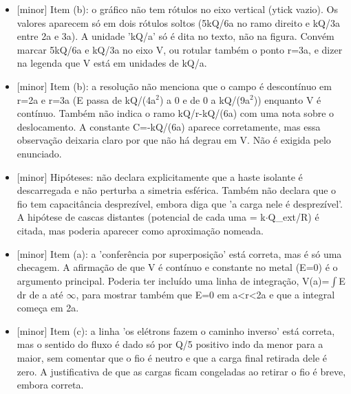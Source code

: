 \documentclass{article}%
\begin{document}
\begin{itemize}%
\item%
{[}minor{]} Item (b): o gráfico não tem rótulos no eixo vertical (ytick vazio). Os valores aparecem só em dois rótulos soltos (5kQ/6a no ramo direito e kQ/3a entre 2a e 3a). A unidade 'kQ/a' só é dita no texto, não na figura. Convém marcar 5kQ/6a e kQ/3a no eixo V, ou rotular também o ponto r=3a, e dizer na legenda que V está em unidades de kQ/a.%
\item%
{[}minor{]} Item (b): a resolução não menciona que o campo é descontínuo em r=2a e r=3a (E passa de kQ/(4a$^2$) a 0 e de 0 a kQ/(9a$^2$)) enquanto V é contínuo. Também não indica o ramo kQ/r-kQ/(6a) com uma nota sobre o deslocamento. A constante C=-kQ/(6a) aparece corretamente, mas essa observação deixaria claro por que não há degrau em V. Não é exigida pelo enunciado.%
\item%
{[}minor{]} Hipóteses: não declara explicitamente que a haste isolante é descarregada e não perturba a simetria esférica. Também não declara que o fio tem capacitância desprezível, embora diga que 'a carga nele é desprezível'. A hipótese de cascas distantes (potencial de cada uma = k$\cdot$Q\_ext/R) é citada, mas poderia aparecer como aproximação nomeada.%
\item%
{[}minor{]} Item (a): a 'conferência por superposição' está correta, mas é só uma checagem. A afirmação de que V é contínuo e constante no metal (E=0) é o argumento principal. Poderia ter incluído uma linha de integração, V(a)=$\int$E dr de a até $\infty$, para mostrar também que E=0 em a<r<2a e que a integral começa em 2a.%
\item%
{[}minor{]} Item (c): a linha 'os elétrons fazem o caminho inverso' está correta, mas o sentido do fluxo é dado só por Q/5 positivo indo da menor para a maior, sem comentar que o fio é neutro e que a carga final retirada dele é zero. A justificativa de que as cargas ficam congeladas ao retirar o fio é breve, embora correta.%
\end{itemize}%
\end{document}
